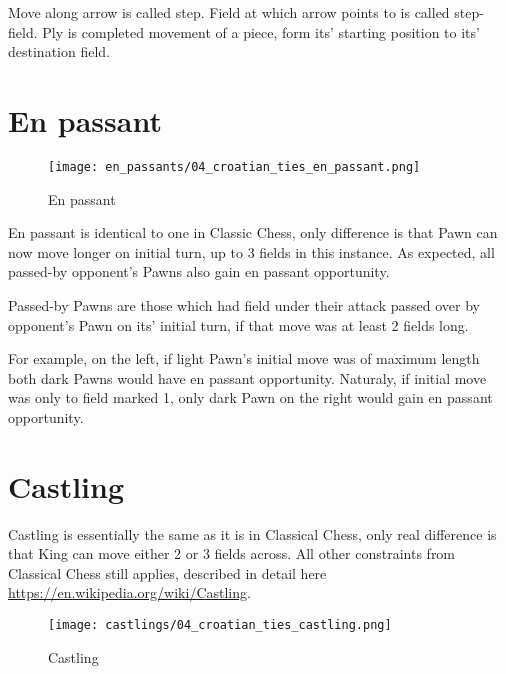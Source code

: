 Move along arrow is called step. Field at which arrow points to is called step-field.
Ply is completed movement of a piece, form its' starting position to its' destination field.

\clearpage %

\section*{En passant}

\noindent
\begin{wrapfigure}[17]{l}{0.4\textwidth}
\texttt{[image: en\_passants/04\_croatian\_ties\_en\_passant.png]}
\caption{En passant}
\label{fig:04_croatian_ties_en_passant}
\end{wrapfigure}
En passant is identical to one in Classic Chess, only difference is that Pawn can now
move longer on initial turn, up to 3 fields in this instance. As expected, all passed-by
opponent's Pawns also gain en passant opportunity.

Passed-by Pawns are those which had field under their attack passed over by opponent's Pawn
on its' initial turn, if that move was at least 2 fields long.

For example, on the left, if light Pawn's initial move was of maximum length both dark Pawns
would have en passant opportunity. Naturaly, if initial move was only to field marked 1, only
dark Pawn on the right would gain en passant opportunity.

\clearpage %

\section*{Castling}

Castling is essentially the same as it is in Classical Chess, only real difference is that
King can move either 2 or 3 fields across. All other constraints from Classical Chess still
applies, described in detail here \\
\href{https://en.wikipedia.org/wiki/Castling}{https://en.wikipedia.org/wiki/Castling}.

\noindent
\begin{figure}[!h]
\texttt{[image: castlings/04\_croatian\_ties\_castling.png]}
\caption{Castling}
\label{fig:04_croatian_ties_castling}
\end{figure}

